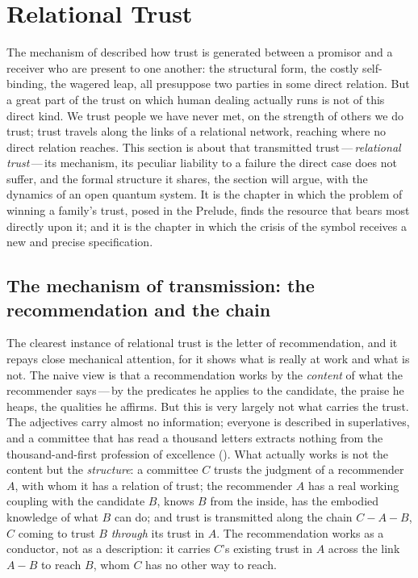 \section{Relational Trust}
\label{p13:sec:relational}

\noindent
The mechanism of  described how trust is generated between a promisor and a receiver who are present to one another: the structural form, the costly self-binding, the wagered leap, all presuppose two parties in some direct relation. But a great part of the trust on which human dealing actually runs is not of this direct kind. We trust people we have never met, on the strength of others we do trust; trust travels along the links of a relational network, reaching where no direct relation reaches. This section is about that transmitted trust\,---\,\emph{relational trust}\,---\,its mechanism, its peculiar liability to a failure the direct case does not suffer, and the formal structure it shares, the section will argue, with the dynamics of an open quantum system. It is the chapter in which the problem of winning a family's trust, posed in the Prelude, finds the resource that bears most directly upon it; and it is the chapter in which the crisis of the symbol receives a new and precise specification.

\subsection{The mechanism of transmission: the recommendation and the chain}
\label{p13:sub:rel-chain}

The clearest instance of relational trust is the letter of recommendation, and it repays close mechanical attention, for it shows what is really at work and what is not. The naive view is that a recommendation works by the \emph{content} of what the recommender says\,---\,by the predicates he applies to the candidate, the praise he heaps, the qualities he affirms. But this is very largely not what carries the trust. The adjectives carry almost no information; everyone is described in superlatives, and a committee that has read a thousand letters extracts nothing from the thousand-and-first profession of excellence (). What actually works is not the content but the \emph{structure}: a committee $C$ trusts the judgment of a recommender $A$, with whom it has a relation of trust; the recommender $A$ has a real working coupling with the candidate $B$, knows $B$ from the inside, has the embodied knowledge of what $B$ can do; and trust is transmitted along the chain $C\!-\!A\!-\!B$, $C$ coming to trust $B$ \emph{through} its trust in $A$. The recommendation works as a conductor, not as a description: it carries $C$'s existing trust in $A$ across the link $A\!-\!B$ to reach $B$, whom $C$ has no other way to reach.

